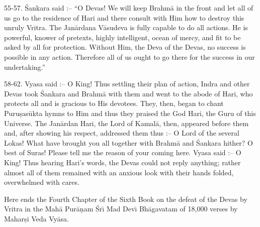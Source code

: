 55-57. \'Sankara said :-- ``O Devas! We will keep Brahm\=a in the front and let all of us go to the residence of Hari and there consult with Him how to destroy this unruly Vritra. The Jan\=ardana V\=asudeva is fully capable to do all actions. He is powerful, knower of pretexts, highly intelligent, ocean of mercy, and fit to be asked by all for protection. Without Him, the Deva of the Devas, no success is possible in any action. Therefore all of us ought to go there for the success in our undertaking.''

58-62. Vyasa said :-- O King! Thus settling their plan of action, Indra and other Devas took \'Sankara and Brahm\=a with them and went to the abode of Hari, who protects all and is gracious to His devotees. They, then, began to chant Puru\d{s}as\=ukta hymns to Him and thus they praised the God Hari, the Guru of this Universe. The Jan\=ardan Hari, the Lord of Kamal\=a, then, appeared before them and, after showing his respect, addressed them thus :-- O Lord of the several Lokas! What have brought you all together with Brahm\=a and \'Sankara hither? O best of Suras! Please tell me the reason of your coming here. Vyasa said :-- O King! Thus hearing Hari's words, the Devas could not reply anything; rather almost all of them remained with an anxious look with their hands folded, overwhelmed with cares.

Here ends the Fourth Chapter of the Sixth Book on the defeat of the Devas by Vritra in the Mah\=a Pur\=a\d{n}am \'Sr\={\i} Mad Dev\={\i} Bh\=agavatam of 18,000 verses by Mahar\d{s}i Veda Vy\=asa.



